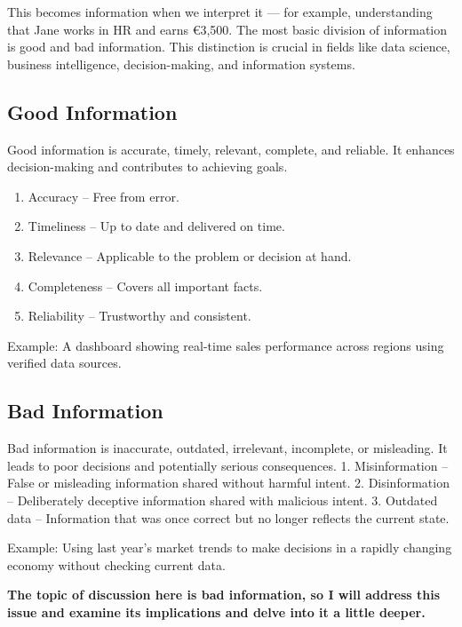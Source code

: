 \documentclass[
  man,
  floatsintext,
  longtable,
  nolmodern,
  notxfonts,
  notimes,
  colorlinks=true,linkcolor=blue,citecolor=blue,urlcolor=blue]{apa7}
\providecommand{\tightlist}{%
  \setlength{\itemsep}{0pt}\setlength{\parskip}{0pt}}
\begin{document}
This becomes information when we interpret it --- for example,
understanding that Jane works in HR and earns €3,500. The most basic
division of information is good and bad information. This distinction is
crucial in fields like data science, business intelligence,
decision-making, and information systems.

\subsection{Good Information}\label{good-information}

Good information is accurate, timely, relevant, complete, and reliable.
It enhances decision-making and contributes to achieving goals.

\begin{enumerate}
\def\labelenumi{\arabic{enumi}.}
\tightlist
\item
  Accuracy -- Free from error.
\item
  Timeliness -- Up to date and delivered on time.
\item
  Relevance -- Applicable to the problem or decision at hand.
\item
  Completeness -- Covers all important facts.
\item
  Reliability -- Trustworthy and consistent.
\end{enumerate}

Example: A dashboard showing real-time sales performance across regions
using verified data sources.

\subsection{Bad Information}\label{bad-information}

Bad information is inaccurate, outdated, irrelevant, incomplete, or
misleading. It leads to poor decisions and potentially serious
consequences. 1. Misinformation -- False or misleading information
shared without harmful intent. 2. Disinformation -- Deliberately
deceptive information shared with malicious intent. 3. Outdated data --
Information that was once correct but no longer reflects the current
state.

Example: Using last year's market trends to make decisions in a rapidly
changing economy without checking current data.

\textbf{The topic of discussion here is bad information, so I will
address this issue and examine its implications and delve into it a
little deeper.}
\end{document}
